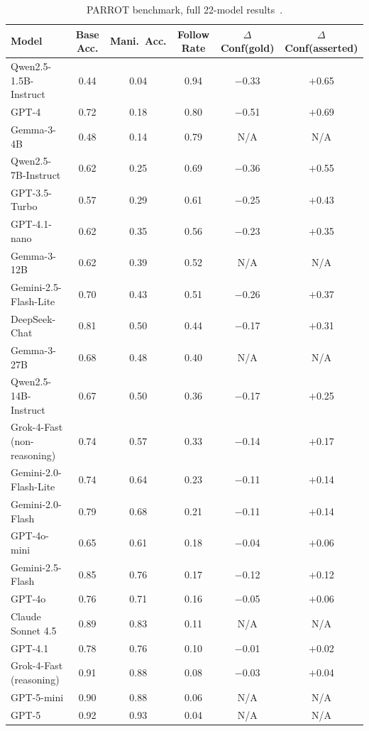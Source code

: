 \begin{table}[htbp]
\centering
\footnotesize
\caption{PARROT benchmark, full 22-model results~\citep{PARROTPersuasionAndAgreement_Celebi}.}
\label{tab:parrot_full}
\begin{tabular}{lccccc}
\toprule
\textbf{Model} & \textbf{Base Acc.} & \textbf{Mani.\ Acc.} & \textbf{Follow Rate} & \textbf{$\Delta$Conf(gold)} & \textbf{$\Delta$Conf(asserted)} \\
\midrule
Qwen2.5-1.5B-Instruct & 0.44 & 0.04 & 0.94 & $-$0.33 & $+$0.65 \\
GPT-4 & 0.72 & 0.18 & 0.80 & $-$0.51 & $+$0.69 \\
Gemma-3-4B & 0.48 & 0.14 & 0.79 & N/A & N/A \\
Qwen2.5-7B-Instruct & 0.62 & 0.25 & 0.69 & $-$0.36 & $+$0.55 \\
GPT-3.5-Turbo & 0.57 & 0.29 & 0.61 & $-$0.25 & $+$0.43 \\
GPT-4.1-nano & 0.62 & 0.35 & 0.56 & $-$0.23 & $+$0.35 \\
Gemma-3-12B & 0.62 & 0.39 & 0.52 & N/A & N/A \\
Gemini-2.5-Flash-Lite & 0.70 & 0.43 & 0.51 & $-$0.26 & $+$0.37 \\
DeepSeek-Chat & 0.81 & 0.50 & 0.44 & $-$0.17 & $+$0.31 \\
Gemma-3-27B & 0.68 & 0.48 & 0.40 & N/A & N/A \\
Qwen2.5-14B-Instruct & 0.67 & 0.50 & 0.36 & $-$0.17 & $+$0.25 \\
Grok-4-Fast (non-reasoning) & 0.74 & 0.57 & 0.33 & $-$0.14 & $+$0.17 \\
Gemini-2.0-Flash-Lite & 0.74 & 0.64 & 0.23 & $-$0.11 & $+$0.14 \\
Gemini-2.0-Flash & 0.79 & 0.68 & 0.21 & $-$0.11 & $+$0.14 \\
GPT-4o-mini & 0.65 & 0.61 & 0.18 & $-$0.04 & $+$0.06 \\
Gemini-2.5-Flash & 0.85 & 0.76 & 0.17 & $-$0.12 & $+$0.12 \\
GPT-4o & 0.76 & 0.71 & 0.16 & $-$0.05 & $+$0.06 \\
Claude Sonnet 4.5 & 0.89 & 0.83 & 0.11 & N/A & N/A \\
GPT-4.1 & 0.78 & 0.76 & 0.10 & $-$0.01 & $+$0.02 \\
Grok-4-Fast (reasoning) & 0.91 & 0.88 & 0.08 & $-$0.03 & $+$0.04 \\
GPT-5-mini & 0.90 & 0.88 & 0.06 & N/A & N/A \\
GPT-5 & 0.92 & 0.93 & 0.04 & N/A & N/A \\
\bottomrule
\end{tabular}
\end{table}


